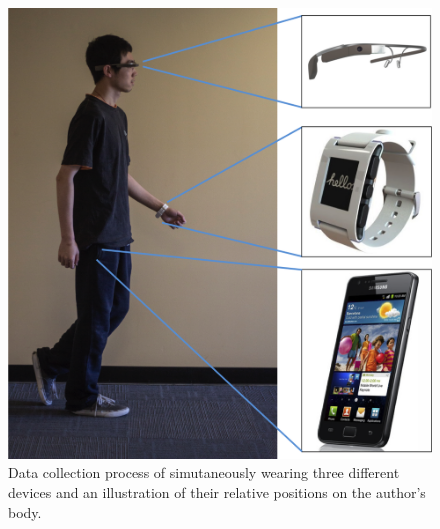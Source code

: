 \begin{figure}
  \centering
  \includegraphics[width=0.9\columnwidth]{figures/experiement_setup.png}
  \caption{Data collection process of simutaneously wearing three different devices and an illustration of their relative positions on the author's body.}
  \label{fig:exp}
\end{figure}




